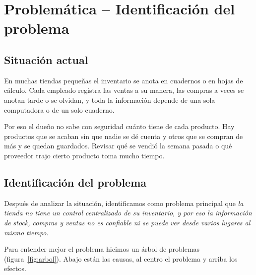 \documentclass[12pt,a4paper]{article}
\begin{document}
\section{Problemática -- Identificación del problema}\label{sec:problematica}

\subsection{Situación actual}

En muchas tiendas pequeñas el inventario se anota en cuadernos o en hojas de cálculo. Cada empleado registra las ventas a su manera, las compras a veces se anotan tarde o se olvidan, y toda la información depende de una sola computadora o de un solo cuaderno.

Por eso el dueño no sabe con seguridad cuánto tiene de cada producto. Hay productos que se acaban sin que nadie se dé cuenta y otros que se compran de más y se quedan guardados. Revisar qué se vendió la semana pasada o qué proveedor trajo cierto producto toma mucho tiempo.

\subsection{Identificación del problema}

Después de analizar la situación, identificamos como problema principal que \textit{la tienda no tiene un control centralizado de su inventario, y por eso la información de stock, compras y ventas no es confiable ni se puede ver desde varios lugares al mismo tiempo}.

Para entender mejor el problema hicimos un árbol de problemas (figura~\ref{fig:arbol}). Abajo están las causas, al centro el problema y arriba los efectos.
\end{document}
